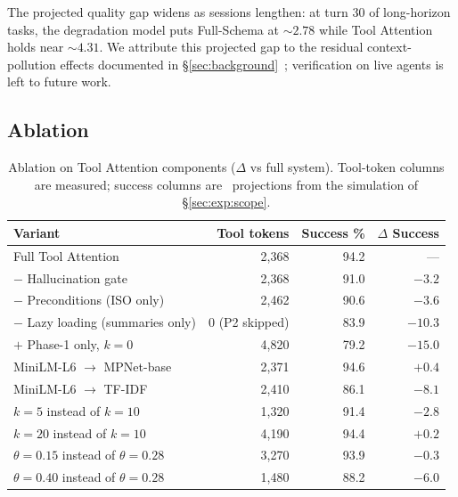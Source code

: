 \documentclass[11pt]{article}
\newcommand{\toprule}{\hline\hline}
\newcommand{\midrule}{\hline}
\newcommand{\bottomrule}{\hline\hline}
\begin{document}
The projected quality gap widens as sessions lengthen: at turn 30 of long-horizon tasks, the degradation model puts Full-Schema at ${\sim}2.78$ while Tool Attention holds near ${\sim}4.31$. We attribute this projected gap to the residual context-pollution effects documented in \S\ref{sec:background}~\citep{pan2026agent,modarressi2025nolima}; verification on live agents is left to future work.

\subsection{Ablation}

\begin{table}[t]
\centering
\caption{Ablation on Tool Attention components ($\Delta$ vs full system). Tool-token columns are measured; success columns are \dag\ projections from the simulation of \S\ref{sec:exp:scope}.}
\label{tab:ablation}
\begin{tabular}{lrrr}
\toprule
\textbf{Variant} & \textbf{Tool tokens} & \textbf{Success \%} & \textbf{$\Delta$ Success} \\
\midrule
Full Tool Attention                              & 2{,}368 & 94.2 & --- \\
\hspace{1em} $-$ Hallucination gate              & 2{,}368 & 91.0 & $-3.2$ \\
\hspace{1em} $-$ Preconditions (ISO only)        & 2{,}462 & 90.6 & $-3.6$ \\
\hspace{1em} $-$ Lazy loading (summaries only)   & 0 (P2 skipped) & 83.9 & $-10.3$ \\
\hspace{1em} $+$ Phase-1 only, $k=0$              & 4{,}820 & 79.2 & $-15.0$ \\
MiniLM-L6 $\to$ MPNet-base                        & 2{,}371 & 94.6 & $+0.4$ \\
MiniLM-L6 $\to$ TF-IDF                            & 2{,}410 & 86.1 & $-8.1$ \\
$k=5$ instead of $k=10$                           & 1{,}320 & 91.4 & $-2.8$ \\
$k=20$ instead of $k=10$                          & 4{,}190 & 94.4 & $+0.2$ \\
$\theta=0.15$ instead of $\theta=0.28$            & 3{,}270 & 93.9 & $-0.3$ \\
$\theta=0.40$ instead of $\theta=0.28$            & 1{,}480 & 88.2 & $-6.0$ \\
\bottomrule
\end{tabular}
\end{table}
\end{document}
